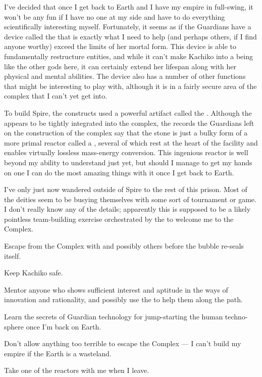 \documentclass[char]{guardians}
\begin{document}
I've decided that once I get back to Earth and I have my empire in full-swing, it won't be any fun if I have no one at my side and have to do everything scientifically interesting myself. Fortunately, it seems as if the Guardians have a device called the \assembler{} that is exactly what I need to help \cKachiko{} (and perhaps others, if I find anyone worthy) exceed the limits of her mortal form. This device is able to fundamentally restructure entities, and while it can't make Kachiko into a being like the other gods here, it can certainly extend her lifespan along with her physical and mental abilities. The device also has a number of other functions that might be interesting to play with, although it is in a fairly secure area of the complex that I can't yet get into.

To build Spire, the constructs used a powerful artifact called the \stone{}. Although the \stone{} appears to be tightly integrated into the complex, the records the Guardians left on the construction of the complex say that the stone is just a bulky form of a more primal reactor called a \core{}, several of which rest at the heart of the facility and enables virtually lossless mass-energy conversion. This ingenious reactor is well beyond my ability to understand just yet, but should I manage to get my hands on one I can do the most amazing things with it once I get back to Earth.

I've only just now wandered outside of Spire to the rest of this prison. Most of the deities seem to be busying themselves with some sort of tournament or game. I don't really know any of the details; apparently this is supposed to be a likely pointless team-building exercise orchestrated by the \cCaretaker{} to welcome me to the Complex.




\begin{itemz}[Goals]
  \item Escape from the Complex with \cKachiko{} and possibly others before the bubble re-seals itself.
  \item Keep Kachiko safe.
  \item Mentor anyone who shows sufficient interest and aptitude in the ways of innovation and rationality, and possibly use the \assembler{} to help them along the path.
  \item Learn the secrets of Guardian technology for jump-starting the human techno-sphere once I'm back on Earth.
  \item Don't allow anything too terrible to escape the Complex --- I can't build my empire if the Earth is a wasteland.
  \item Take one of the \core{} reactors with me when I leave.
\end{itemz}
\end{document}
